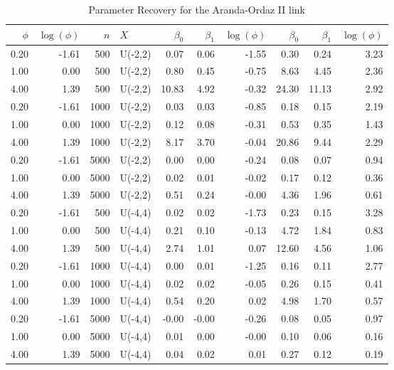 \begin{table}[ht]
\begin{center}
\caption{Parameter Recovery for the Aranda-Ordaz II link}
\label{ao2table}
\begin{tabular}{rrrlrrrrrr}
  \toprule
$\phi$ & $\log(\phi)$ & $n$ & $X$ & $  \beta_0$ &   $\beta_1$ &   $\log(\phi)$ & $   \beta_0$ &    $\beta_1$ &    $\log(\phi)$ \\ 
  \midrule
0.20 & -1.61 & 500 & U(-2,2) & 0.07 & 0.06 & -1.55 & 0.30 & 0.24 & 3.23 \\ 
  1.00 & 0.00 & 500 & U(-2,2) & 0.80 & 0.45 & -0.75 & 8.63 & 4.45 & 2.36 \\ 
  4.00 & 1.39 & 500 & U(-2,2) & 10.83 & 4.92 & -0.32 & 24.30 & 11.13 & 2.92 \\ 
  0.20 & -1.61 & 1000 & U(-2,2) & 0.03 & 0.03 & -0.85 & 0.18 & 0.15 & 2.19 \\ 
  1.00 & 0.00 & 1000 & U(-2,2) & 0.12 & 0.08 & -0.31 & 0.53 & 0.35 & 1.43 \\ 
  4.00 & 1.39 & 1000 & U(-2,2) & 8.17 & 3.70 & -0.04 & 20.86 & 9.44 & 2.29 \\ 
  0.20 & -1.61 & 5000 & U(-2,2) & 0.00 & 0.00 & -0.24 & 0.08 & 0.07 & 0.94 \\ 
  1.00 & 0.00 & 5000 & U(-2,2) & 0.02 & 0.01 & -0.02 & 0.17 & 0.12 & 0.36 \\ 
  4.00 & 1.39 & 5000 & U(-2,2) & 0.51 & 0.24 & -0.00 & 4.36 & 1.96 & 0.61 \\ 
  0.20 & -1.61 & 500 & U(-4,4) & 0.02 & 0.02 & -1.73 & 0.23 & 0.15 & 3.28 \\ 
  1.00 & 0.00 & 500 & U(-4,4) & 0.21 & 0.10 & -0.13 & 4.72 & 1.84 & 0.83 \\ 
  4.00 & 1.39 & 500 & U(-4,4) & 2.74 & 1.01 & 0.07 & 12.60 & 4.56 & 1.06 \\ 
  0.20 & -1.61 & 1000 & U(-4,4) & 0.00 & 0.01 & -1.25 & 0.16 & 0.11 & 2.77 \\ 
  1.00 & 0.00 & 1000 & U(-4,4) & 0.02 & 0.02 & -0.05 & 0.26 & 0.15 & 0.41 \\ 
  4.00 & 1.39 & 1000 & U(-4,4) & 0.54 & 0.20 & 0.02 & 4.98 & 1.70 & 0.57 \\ 
  0.20 & -1.61 & 5000 & U(-4,4) & -0.00 & -0.00 & -0.26 & 0.08 & 0.05 & 0.97 \\ 
  1.00 & 0.00 & 5000 & U(-4,4) & 0.01 & 0.00 & -0.00 & 0.10 & 0.06 & 0.16 \\ 
  4.00 & 1.39 & 5000 & U(-4,4) & 0.04 & 0.02 & 0.01 & 0.27 & 0.12 & 0.19 \\ 
   \bottomrule
\end{tabular}
\end{center}
\end{table}
